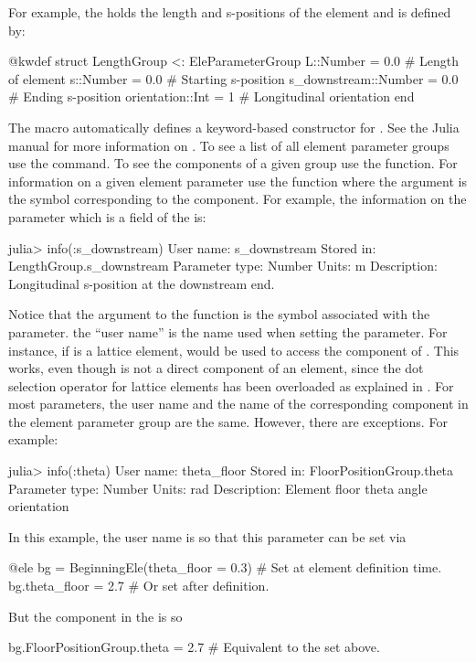 For example, the  holds the length and s-positions of the element and is defined by:
\begin{example}
  @kwdef struct LengthGroup <: EleParameterGroup
    L::Number = 0.0               # Length of element
    s::Number = 0.0               # Starting s-position
    s_downstream::Number = 0.0    # Ending s-position
    orientation::Int = 1          # Longitudinal orientation
  end
\end{example}
The  macro automatically defines a keyword-based constructor for .
See the Julia manual for more information on . 
To see a list of all element parameter groups use the  command.
To see the components of a given group use the  function. For information on
a given element parameter use the  function where the argument is the
symbol corresponding to the component. For example, the information on
the  parameter which is a field of the  is:
\begin{example}
  julia> info(:s_downstream)
    User name:       s_downstream
    Stored in:       LengthGroup.s_downstream
    Parameter type:  Number
    Units:           m
    Description:     Longitudinal s-position at the downstream end.
\end{example}
Notice that the argument to the  function is the symbol associated with the parameter.
the ``user name'' is the name used when setting the parameter. For instance, if  is a
lattice element,  would be used to access the  component of .
This works, even though  is not a direct component of an element, since the dot
selection operator for lattice elements has been overloaded as explained in .
For most parameters, the user name and the name of the corresponding component in the element parameter
group are the same. However, there are exceptions. For example:
\begin{example}
  julia> info(:theta)
    User name:       theta_floor
    Stored in:       FloorPositionGroup.theta
    Parameter type:  Number
    Units:           rad
    Description:     Element floor theta angle orientation
\end{example}
In this example, the user name is  so that this parameter can be set via
\begin{example}
  @ele bg = BeginningEle(theta_floor = 0.3)    # Set at element definition time.
  bg.theta_floor = 2.7                         # Or set after definition.
\end{example}
But the component in the  is  so
\begin{example}
  bg.FloorPositionGroup.theta = 2.7   # Equivalent to the set above.
\end{example}

